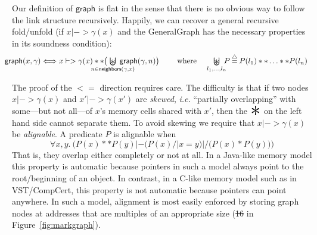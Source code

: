 \documentclass[acmsmall,screen]{acmart}  %
\newcommand{\scon}{\mathbin{\star}} %
\renewcommand{\scon}{\mathbin{\ast}} \renewcommand{\bigstar}{\raisebox{-0.24em}{{\scaleobj{2.5}{\scon}}}} %
\newcommand{\bigocon}{\raisebox{-0.3ex}{\resizebox{0.75em}{!}{\hspace{0.05em}$\scon$}}\hspace{-2.18ex} \bigcup} %
\newcommand{\defeq}{\mathbin{\stackrel{\triangle}{=}}} %
\newcommand{\p}[1]{\ensuremath{\mathsf{#1}}} \newcommand{\m}[1]{\ensuremath{\mathit{#1}}} \newcommand{\ma}[1]{\ensuremath{\mathcal{#1}}} \let\ramify\lightning
\providecommand{\DIFadd}[1]{{\protect\color{blue}\uwave{#1}}} %
\providecommand{\DIFdel}[1]{{\protect\color{red}\sout{#1}}}                      %
\providecommand{\DIFaddbegin}{} %
\providecommand{\DIFaddend}{} %
\providecommand{\DIFdelbegin}{} %
\providecommand{\DIFdelend}{} %
\newcommand{\DIFscaledelfig}{0.5}
\newlength{\DIFdelgraphicswidth} %
\newlength{\DIFdelgraphicsheight} %
\newcommand{\DIFaddincludegraphics}[2][]{{\color{blue}\fbox{\DIFOincludegraphics[#1]{#2}}}} %
\newcommand{\DIFdelincludegraphics}[2][]{%
\sbox{\DIFdelgraphicsbox}{\DIFOincludegraphics[#1]{#2}}%
\settoboxwidth{\DIFdelgraphicswidth}{\DIFdelgraphicsbox} %
\settoboxtotalheight{\DIFdelgraphicsheight}{\DIFdelgraphicsbox} %
\scalebox{\DIFscaledelfig}{%
\parbox[b]{\DIFdelgraphicswidth}{\usebox{\DIFdelgraphicsbox}\\[-\baselineskip] \rule{\DIFdelgraphicswidth}{0em}}\llap{\resizebox{\DIFdelgraphicswidth}{\DIFdelgraphicsheight}{%
\setlength{\unitlength}{\DIFdelgraphicswidth}%
\begin{picture}(1,1)%
\thicklines\linethickness{2pt} %
{\color[rgb]{1,0,0}\put(0,0){\framebox(1,1){}}}%
{\color[rgb]{1,0,0}\put(0,0){\line( 1,1){1}}}%
{\color[rgb]{1,0,0}\put(0,1){\line(1,-1){1}}}%
\end{picture}%
}\hspace*{3pt}}} %
} %
\DeclareRobustCommand{\DIFaddbegin}{\DIFOaddbegin \let\includegraphics\DIFaddincludegraphics} %
\DeclareRobustCommand{\DIFaddend}{\DIFOaddend \let\includegraphics\DIFOincludegraphics} %
\DeclareRobustCommand{\DIFdelbegin}{\DIFOdelbegin \let\includegraphics\DIFdelincludegraphics} %
\DeclareRobustCommand{\DIFdelend}{\DIFOaddend \let\includegraphics\DIFOincludegraphics} %
\begin{document}
Our definition of \p{graph} is flat in the sense that there is no obvious way to follow the link structure recursively.  Happily, we can recover a general recursive fold/unfold (if $x |-> \gamma(x)$ and the GeneralGraph has the necessary properties in its soundness condition):
\vspace{-1ex}
\begin{equation}
\label{eqn:unfold_graph}
\hspace{-1em}\DIFdelbegin %
\DIFdelend \DIFaddbegin \begin{array}{@{}lc@{\hspace{1pt}}c@{\hspace{1pt}}l@{}}
\p{graph}(x,\gamma)  <=>  x |-> \gamma(x) ** \big(\!\!\!\!\!\!\!\!\!\!\!\!\!\underset{n \in \p{neighbors}(\gamma,x)}{\bigocon}\!\!\!\!\!\!\!\!\!\!\!\! \p{graph}(\gamma,n) \big)
\quad \text{~~~ where ~~ }\underset{l_1,\dots,l_n}{\raisebox{-0.3ex}{\resizebox{0.75em}{!}{\hspace{0.05em}$\scon$}}\hspace{-2.18ex} \bigcup} \! \! P  \defeq  P(l_1) ** \ldots ** P(l_n) \end{array}
\DIFaddend \vspace{-1ex}
\end{equation}

The proof of the $<=$ direction requires care. The difficulty is that if two nodes $x |-> \gamma(x)$ and $x' |-> \gamma(x')$ are \emph{skewed}, \emph{i.e.} ``partially overlapping'' with some---but not all---of $x$'s memory cells shared with $x'$, then the $\bigstar$ on the left hand side cannot separate them.  To avoid skewing we require that $x |-> \gamma(x)$ be \emph{alignable}. A predicate $P$ is alignable when
\[
\forall x,y.~ \Big(P(x) ** P(y) |- \big(P(x) /| x = y\big) |/ \big(P(x) * P(y)\big)\Big)
\]
That is, they overlap either completely or not at all. In a Java-like memory model this property is automatic because pointers in such a model always point to the root/beginning of an object.  In contrast, in a C-like memory model such as in VST/CompCert, this property is not automatic because pointers can point anywhere.  In such a model, alignment is most easily enforced by storing graph nodes at addresses that are multiples of an appropriate size (\DIFdelbegin \DIFdel{16 }\DIFdelend \DIFaddbegin \emph{\DIFadd{e.g}} \DIFadd{this size is $16$ }\DIFaddend in Figure~\ref{fig:markgraph}).
\end{document}
